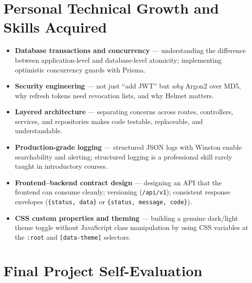 \documentclass[12pt,a4paper]{report}
\begin{document}
\section{Personal Technical Growth and Skills Acquired}

\begin{itemize}[leftmargin=2em]
  \item \textbf{Database transactions and concurrency} — understanding the difference between
    application-level and database-level atomicity; implementing optimistic concurrency
    guards with Prisma.
  \item \textbf{Security engineering} — not just ``add JWT'' but \emph{why} Argon2 over MD5,
    why refresh tokens need revocation lists, and why Helmet matters.
  \item \textbf{Layered architecture} — separating concerns across routes, controllers,
    services, and repositories makes code testable, replaceable, and understandable.
  \item \textbf{Production-grade logging} — structured JSON logs with Winston enable
    searchability and alerting; structured logging is a professional skill rarely taught in
    introductory courses.
  \item \textbf{Frontend–backend contract design} — designing an API that the frontend can
    consume cleanly; versioning (\texttt{/api/v1}); consistent response envelopes
    (\texttt{\{status, data\}} or \texttt{\{status, message, code\}}).
  \item \textbf{CSS custom properties and theming} — building a genuine dark/light theme
    toggle without JavaScript class manipulation by using CSS variables at the
    \texttt{:root} and \texttt{[data-theme]} selectors.
\end{itemize}

\section{Final Project Self-Evaluation}
\end{document}
